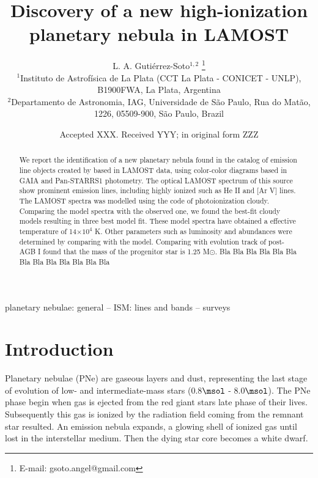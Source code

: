 \documentclass[fleqn,usenatbib]{mnras}
\title[New high-ionization planetary nebula]{Discovery of a new high-ionization planetary nebula in LAMOST}
\author[Guti\'errez-Soto et al.]{
  L. A. Guti\'errez-Soto$^{1,2}$
  \thanks{E-mail: gsoto.angel@gmail.com}
\\
$^{1}$Instituto de Astrof\'{i}sica de La Plata (CCT La Plata - CONICET - UNLP), B1900FWA, La Plata, Argentina\\
$^{2}$Departamento de Astronomia, IAG, Universidade de S\~{a}o Paulo, Rua do Mat\~{a}o, 1226, 05509-900, S\~{a}o Paulo, Brazil\\
}
\date{Accepted XXX. Received YYY; in original form ZZZ}
\begin{document}
\label{firstpage}
\pagerange{\pageref{firstpage}--\pageref{lastpage}}
\maketitle

\begin{abstract}
  We report the identification of a new planetary nebula found in the catalog of
  emission line objects created by \citet{Skoda:2020} based in LAMOST data, using
  color-color diagrams based in GAIA and Pan-STARRS1 photometry. The optical LAMOST
  spectrum of this source show prominent emission lines, including highly ionized
  such as He II and [Ar V] lines. The LAMOST spectra was
  modelled using the code of photoionization  {\sc cloudy}.
  Comparing the model spectra with the observed one, we found
  the best-fit {\sc cloudy} models resulting in three best model fit.
  These model spectra have obtained a effective temperature of 14$\times10^{4}$ K.
  Other parameters such as luminosity and abundances were determined by
  comparing with the model. Comparing with evolution track of post-AGB
  I found that the mass of the progenitor star is 1.25 M{$\odot$}. Bla Bla Bla Bla
  Bla Bla Bla Bla Bla Bla Bla Bla Bla
\end{abstract}

\begin{keywords}
planetary nebulae: general -- ISM: lines and bands -- surveys
\end{keywords}



\section{Introduction}

\label{sec:intro}

Planetary nebulae (PNe) are gaseous layers and dust, representing the last stage of
evolution of low- and intermediate-mass stars (0.8$\msol$ - 8.0$\msol$).
The PNe phase begin when gas is ejected from the red giant stars late phase of
their lives. Subsequently this gas is ionized by the radiation field coming from the remnant
star resulted. An emission nebula expands, a glowing shell of ionized gas until lost in the
interstellar medium. Then the dying star core becomes a white dwarf.
\end{document}
